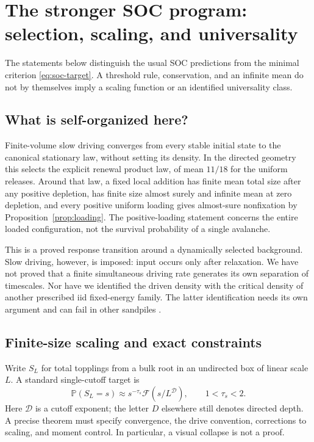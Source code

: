 \documentclass[11pt]{article}
\numberwithin{equation}{section}
\theoremstyle{definition}
\newcommand{\Prob}{\mathbb P}
\begin{document}
\section{The stronger SOC program: selection, scaling, and universality}\label{sec:scaling}

The statements below distinguish the usual SOC predictions from the minimal criterion \eqref{eq:soc-target}. A threshold rule, conservation, and an infinite mean do not by themselves imply a scaling function or an identified universality class.

\subsection{What is self-organized here?}
Finite-volume slow driving converges from every stable initial state to the canonical stationary law, without setting its density. In the directed geometry this selects the explicit renewal product law, of mean $11/18$ for the uniform releases. Around that law, a fixed local addition has finite mean total size after any positive depletion, has finite size almost surely and infinite mean at zero depletion, and every positive uniform loading gives almost-sure nonfixation by Proposition~\ref{prop:loading}. The positive-loading statement concerns the entire loaded configuration, not the survival probability of a single avalanche.

This is a proved response transition around a dynamically selected background. Slow driving, however, is imposed: input occurs only after relaxation. We have not proved that a finite simultaneous driving rate generates its own separation of timescales. Nor have we identified the driven density with the critical density of another prescribed iid fixed-energy family. The latter identification needs its own argument and can fail in other sandpiles \cite{FLW}.

\subsection{Finite-size scaling and exact constraints}
Write $S_L$ for total topplings from a bulk root in an undirected box of linear scale $L$. A standard single-cutoff target is
\begin{equation}\label{eq:fss-target}
 \Prob(S_L=s)\approx s^{-\tau_s}\mathcal F(s/L^{\mathcal D}),
 \qquad 1<\tau_s<2.
\end{equation}
Here $\mathcal D$ is a cutoff exponent; the letter $D$ elsewhere still denotes directed depth. A precise theorem must specify convergence, the drive convention, corrections to scaling, and moment control. In particular, a visual collapse is not a proof.
\end{document}
